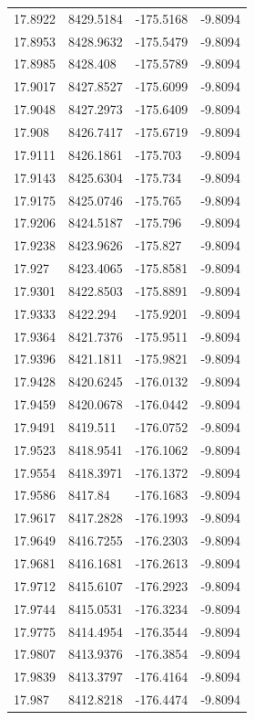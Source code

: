 \begin{table}[H]
\begin{tabular}{llll}
17.8922 & 8429.5184 & -175.5168 & -9.8094 \\
17.8953 & 8428.9632 & -175.5479 & -9.8094 \\
17.8985 & 8428.408 & -175.5789 & -9.8094 \\
17.9017 & 8427.8527 & -175.6099 & -9.8094 \\
17.9048 & 8427.2973 & -175.6409 & -9.8094 \\
17.908 & 8426.7417 & -175.6719 & -9.8094 \\
17.9111 & 8426.1861 & -175.703 & -9.8094 \\
17.9143 & 8425.6304 & -175.734 & -9.8094 \\
17.9175 & 8425.0746 & -175.765 & -9.8094 \\
17.9206 & 8424.5187 & -175.796 & -9.8094 \\
17.9238 & 8423.9626 & -175.827 & -9.8094 \\
17.927 & 8423.4065 & -175.8581 & -9.8094 \\
17.9301 & 8422.8503 & -175.8891 & -9.8094 \\
17.9333 & 8422.294 & -175.9201 & -9.8094 \\
17.9364 & 8421.7376 & -175.9511 & -9.8094 \\
17.9396 & 8421.1811 & -175.9821 & -9.8094 \\
17.9428 & 8420.6245 & -176.0132 & -9.8094 \\
17.9459 & 8420.0678 & -176.0442 & -9.8094 \\
17.9491 & 8419.511 & -176.0752 & -9.8094 \\
17.9523 & 8418.9541 & -176.1062 & -9.8094 \\
17.9554 & 8418.3971 & -176.1372 & -9.8094 \\
17.9586 & 8417.84 & -176.1683 & -9.8094 \\
17.9617 & 8417.2828 & -176.1993 & -9.8094 \\
17.9649 & 8416.7255 & -176.2303 & -9.8094 \\
17.9681 & 8416.1681 & -176.2613 & -9.8094 \\
17.9712 & 8415.6107 & -176.2923 & -9.8094 \\
17.9744 & 8415.0531 & -176.3234 & -9.8094 \\
17.9775 & 8414.4954 & -176.3544 & -9.8094 \\
17.9807 & 8413.9376 & -176.3854 & -9.8094 \\
17.9839 & 8413.3797 & -176.4164 & -9.8094 \\
17.987 & 8412.8218 & -176.4474 & -9.8094 \\

\end{tabular}
\end{table}
